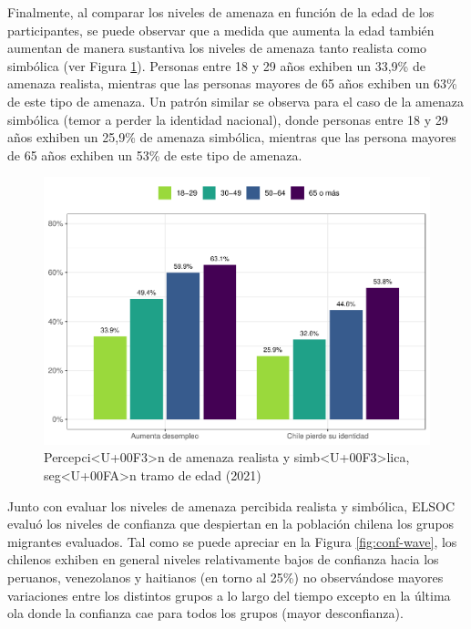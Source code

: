 \documentclass[
  12pt,
]{book}
\begin{document}
Finalmente, al comparar los niveles de amenaza en función de la edad de los participantes, se puede observar que a medida que aumenta la edad también aumentan de manera sustantiva los niveles de amenaza tanto realista como simbólica (ver Figura \ref{fig:amen-edad}). Personas entre 18 y 29 años exhiben un 33,9\% de amenaza realista, mientras que las personas mayores de 65 años exhiben un 63\% de este tipo de amenaza. Un patrón similar se observa para el caso de la amenaza simbólica (temor a perder la identidad nacional), donde personas entre 18 y 29 años exhiben un 25,9\% de amenaza simbólica, mientras que las persona mayores de 65 años exhiben un 53\% de este tipo de amenaza.

\begin{figure}

{\centering \includegraphics{reporte-elsoc_files/figure-latex/amen-edad-1} 

}

\caption{Percepci<U+00F3>n de amenaza realista y simb<U+00F3>lica, seg<U+00FA>n tramo de edad (2021)}\label{fig:amen-edad}
\end{figure}

Junto con evaluar los niveles de amenaza percibida realista y simbólica, ELSOC evaluó los niveles de confianza que despiertan en la población chilena los grupos migrantes evaluados. Tal como se puede apreciar en la Figura \ref{fig:conf-wave}, los chilenos exhiben en general niveles relativamente bajos de confianza hacia los peruanos, venezolanos y haitianos (en torno al 25\%) no observándose mayores variaciones entre los distintos grupos a lo largo del tiempo excepto en la última ola donde la confianza cae para todos los grupos (mayor desconfianza).
\end{document}
